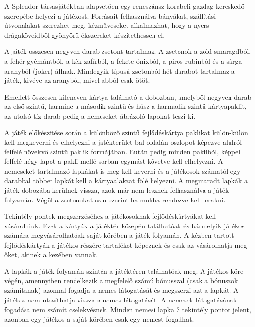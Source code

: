 
A Splendor társasjátékban alapvetően egy reneszánsz korabeli gazdag kereskedő szerepébe helyezi a játékost.
Forrásait felhasználva bányákat, szállítási útvonalakat szerezhet meg, kézműveseket
alkalmazhat, hogy a nyers drágaköveidből gyönyörű ékszereket készítethessen el.\par

A játék összesen negyven darab zsetont tartalmaz. A zsetonok a zöld smaragdból, a fehér gyémántból, a kék zafírból, a fekete ónixból, a piros rubinból és a sárga aranyból (joker) állnak. Mindegyik típusú zsetonból hét darabot tartalmaz a játék, kivéve az aranyból, mivel abból csak ötöt.\par

Emellett összesen kilencven kártya található a dobozban, amelyből negyven darab az első szintű, harminc a második szintű és húsz a harmadik szintű kártyapaklit, az utolsó tíz darab pedig a nemeseket ábrázoló lapokat teszi ki.\par

A játék előkészítése során a különböző szintű fejlődéskártya paklikat külön-külön kell megkeverni és elhelyezni a játékterület bal oldalán oszlopot képezve alulról felfelé növekvő szintű paklik formájában.
Eután pedig minden pakliból, képpel felfelé négy lapot a pakli mellé sorban
egymást követve kell elhelyezni.
A nemeseket tartalmazó lapkákat is meg kell keverni és a játékosok számatól egy darabbal többet lapkát kell a kártyaalakzat fölé helyezni. A megmaradt lapkák a játék dobozába kerülnek vissza, azok már nem lesznek
felhasználva a játék folyamán. Végül a zsetonokat szín szerint halmokba rendezve kell lerakni.

Tekintély pontok megszerzéséhez a játékosoknak fejlődéskártyákat kell vásárolniuk. Ezek a kártyák a játéktér közepén találhatóak és bármelyik játékos számára megvásárolhatóak saját körében a játék folyamán. A kézben tartott fejlődéskártyák a játékos részére tartalékot képeznek és csak az vásárolhatja meg őket, akinek a kezében vannak.\par

A lapkák a játék folyamán szintén a játéktéren találhatóak meg. A játékos köre végén, amennyiben rendelkezik a megfelelő számú bónusszal (csak a bónuszok számítanak) azonnal fogadja a nemes látogatását és megszerzi azt a lapkát. A játékos nem utasíthatja vissza a nemes látogatását. A nemesek látogatásának fogadása nem számít cselekvésnek. Minden nemesi lapka 3 tekintély pontot jelent, azonban egy játékos a saját körében csak egy nemest fogadhat.

